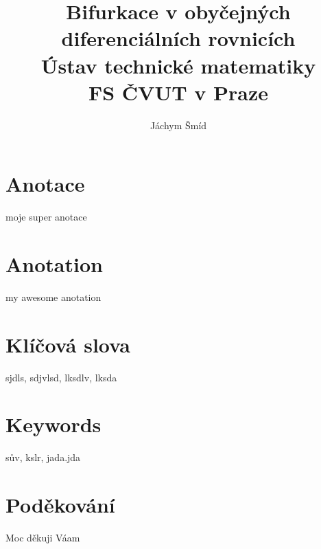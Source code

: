 \documentclass[12pt,a4paper, fleqn]{report}
\date{}
\title{\textbf{Bifurkace v obyčejných diferenciálních rovnicích}\\[2ex]\large{Ústav technické matematiky\\ FS ČVUT v Praze}}
\author{Jáchym Šmíd}
\begin{document}

\setlength{\mathindent}{15pt}
\pagestyle{headings}
\renewcommand{\familydefault}{latinmodernroman}
\newcommand\myemptypage{
    \null
    \thispagestyle{empty}
    \newpage
    }
\setlength{\parskip}{0.5em}
    

\maketitle
\thispagestyle{empty}
\pagebreak

\myemptypage

\thispagestyle{empty}
\section*{Anotace}
moje super anotace
\section*{Anotation}
my awesome anotation
\section*{Klíčová slova}
sjdls, sdjvlsd, lksdlv, lksda
\section*{Keywords}
sův, kslr, jada.jda
\section*{Poděkování}
Moc děkuji Váam
\pagebreak

\thispagestyle{empty}
\tableofcontents
\pagebreak

\thispagestyle{empty}
\end{document}
